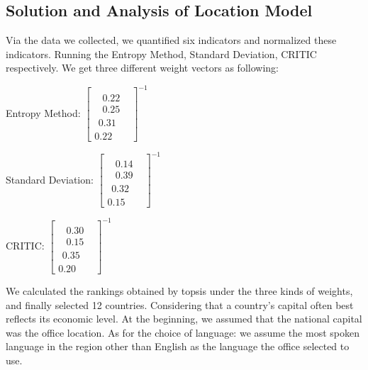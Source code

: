 \documentclass[12pt]{article}  %
\begin{document}
\subsection{Solution and Analysis of Location Model}

Via the data we collected, we quantified six indicators and normalized these indicators. Running the Entropy Method, Standard Deviation, CRITIC respectively. We get three different weight vectors as following:

\begin{center}
	Entropy Method:
	${\left[ {\begin{array}{*{20}{c}}
			{\begin{array}{*{20}{c}}
				{\begin{array}{*{20}{c}}
					{0.22}\\
					{0.25}
					\end{array}}\\
				{0.31}
				\end{array}}\\
			{0.22}
			\end{array}} \right]^{ - 1}}$
	
	Standard Deviation:
	${\left[ {\begin{array}{*{20}{c}}
			{\begin{array}{*{20}{c}}
				{\begin{array}{*{20}{c}}
					{0.14}\\
					{0.39}
					\end{array}}\\
				{0.32}
				\end{array}}\\
			{0.15}
			\end{array}} \right]^{ - 1}}$
	
	CRITIC:
	${\left[ {\begin{array}{*{20}{c}}
			{\begin{array}{*{20}{c}}
				{\begin{array}{*{20}{c}}
					{0.30}\\
					{0.15}
					\end{array}}\\
				{0.35}
				\end{array}}\\
			{0.20}
			\end{array}} \right]^{ - 1}}$
\end{center}

We calculated the rankings obtained by topsis under the three kinds of weights, and finally selected 12 countries. Considering that a country's capital often best reflects its economic level. At the beginning, we assumed that the national capital was the office location. As for the choice of language: we assume the most spoken language in the region other than English as the language the office selected to use.
\end{document}
